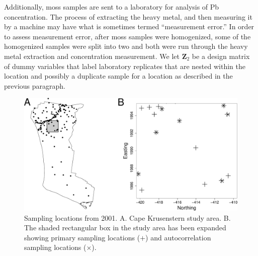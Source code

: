 \documentclass[12pt, titlepage]{article}
\begin{document}
Additionally, moss samples are sent to a laboratory for analysis of Pb concentration.  The process of extracting the heavy metal, and then measuring it by a machine may have what is sometimes termed ``measurement error.''  In order to assess measurement error, after moss samples were homogenized, some of the homogenized samples were split into two and both were run through the heavy metal extraction and concentration measurement.  We let $\mathbf{Z}_{2}$ be a design matrix of dummy variables that label laboratory replicates that are nested within the location and possibly a duplicate sample for a location as described in the previous paragraph.

\begin{figure}[H]
  \begin{center}
	    \includegraphics[width=0.9\linewidth]{Moss_autocorr_samples}
  \end{center}
  \caption{Sampling locations from 2001. A. Cape Krusenstern study area. B.  The shaded rectangular box in the study area has been expanded showing primary sampling locations ($+$) and autocorrelation sampling locations ($\times$).  \label{Fig:MossACsamples}}
\end{figure}
\end{document}
